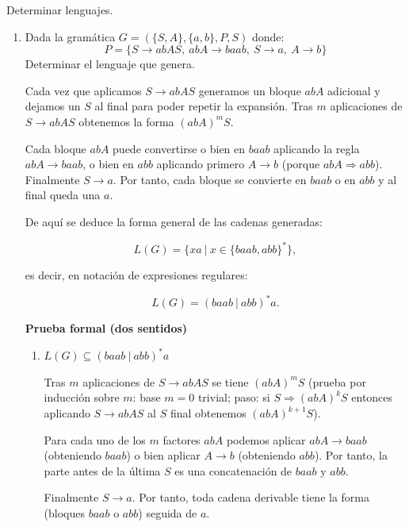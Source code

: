 \documentclass[12pt]{report} %
\begin{document}
\begin{ejercicio}
Determinar lenguajes.
\end{ejercicio}

\begin{enumerate}
\def\labelenumi{\alph{enumi})}
\item
  Dada la gramática \(G = (\{S, A\}, \{a, b\}, P, S)\) donde:\\
  \[P = \{S \to abAS, \ abA \to baab, \ S \to a, \ A \to b\}\]
  Determinar el lenguaje que genera.

  \begin{solucion}[Ejercicio 2.a]

       Cada vez que aplicamos $S \to abAS$ generamos un bloque $abA$ adicional y dejamos un $S$ al final para poder repetir la expansión. Tras $m$ aplicaciones de $S \to abAS$ obtenemos la forma $(abA)^mS$.

       Cada bloque $abA$ puede convertirse o bien en $baab$ aplicando la regla $abA \to baab$, o bien en $abb$ aplicando primero $A \to b$ (porque $abA \Rightarrow abb$). Finalmente $S \to a$. Por tanto, cada bloque se convierte en $baab$ o en $abb$ y al final queda una $a$.

       De aquí se deduce la forma general de las cadenas generadas:

       $$
       L(G) = \{ xa \ | \ x \in \{baab, abb\}^* \},
       $$

       es decir, en notación de expresiones regulares:

       $$
       L(G) = (baab \ | \ abb)^* a.
       $$

       \textbf{Prueba formal (dos sentidos)}

       \begin{enumerate}
           \item $L(G) \subseteq (baab \ | \ abb)^* a$

               Tras $m$ aplicaciones de $S \to abAS$ se tiene $(abA)^mS$ (prueba por inducción sobre $m$: base $m=0$ trivial; paso: si $S \Rightarrow (abA)^kS$ entonces aplicando $S \to abAS$ al $S$ final obtenemos $(abA)^{k+1}S$).

               Para cada uno de los $m$ factores $abA$ podemos aplicar $abA \to baab$ (obteniendo $baab$) o bien aplicar $A \to b$ (obteniendo $abb$). Por tanto, la parte antes de la última $S$ es una concatenación de $baab$ y $abb$.

               Finalmente $S \to a$. Por tanto, toda cadena derivable tiene la forma (bloques $baab$ o $abb$) seguida de $a$.


\end{enumerate}
\end{solucion}
\end{enumerate}
\end{document}
